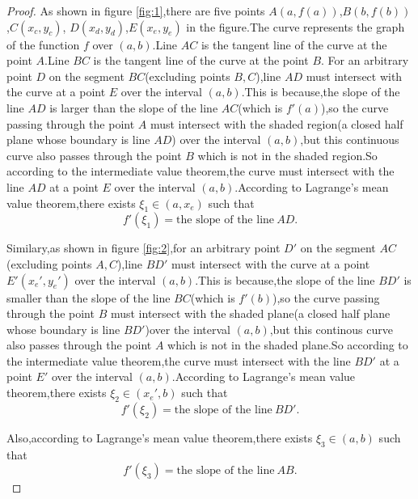\documentclass{article} \usepackage{maa-monthly}
\theoremstyle{theorem} \newtheorem*{theorem}{Theorem}
\theoremstyle{definition} \newtheorem*{definition}{Definition}
\begin{document}
\begin{proof}
  As shown in figure \eqref{fig:1},there are five points
  $A(a,f(a))$,$B(b,f(b))$,$C(x_c,y_c)$, $D(x_{d},y_{d})$,$E(x_e,y_e)$ in the figure.The curve represents the graph
  of the function $f$ over $(a,b)$.Line $AC$ is the tangent line of the curve at
  the point $A$.Line $BC$ is the tangent line of the curve at the
  point $B$. For an arbitrary point $D$ on the segment $BC$(excluding points
  $B,C$),line $AD$ must
  intersect with the curve at a point $E$ over the interval
  $(a,b)$.This is because,the slope of the line $AD$ is larger than
  the slope of the line $AC$(which is $f'(a)$),so the curve passing through the point
  $A$ must intersect with the shaded region(a closed half plane whose
  boundary is line $AD$) over the interval $(a,b)$,but this continuous curve also
  passes through the point $B$ which is not in the shaded region.So according to the intermediate value theorem,the curve must
  intersect with the line $AD$ at a point $E$ over the interval
  $(a,b)$.According to Lagrange's mean value theorem,there exists
  $\xi_1\in (a,x_e)$ such that 
\begin{equation}\label{eq:1}
f'(\xi_1)=\mbox{the slope of the line} ~AD.
\end{equation}

Similary,as shown in figure \eqref{fig:2},for an arbitrary point $D'$
on the segment $AC$(excluding points $A,C$),line $BD'$ must intersect with the curve at a
point $E'(x_e',y_e')$ over the interval $(a,b)$.This is because,the
slope of the line $BD'$ is smaller than the slope of the line
$BC$(which is $f'(b)$),so the curve passing through the point $B$ must
intersect with the shaded plane(a closed half plane whose boundary is
line $BD'$)over the interval $(a,b)$,but this continous curve also passes through
the point $A$ which is not in the shaded plane.So according to the intermediate value theorem,the curve must
  intersect with the line $BD'$ at a point $E'$ over the interval
  $(a,b)$.According to Lagrange's mean value theorem,there exists
  $\xi_2\in (x_e',b)$ such that
\begin{equation}\label{eq:2}
f'(\xi_2)=\mbox{the slope of the line}~BD'.
\end{equation}

Also,according to Lagrange's mean value theorem,there exists $\xi_3\in
(a,b)$ such that
\begin{equation}
  \label{eq:3}
  f'(\xi_3)=\mbox{the slope of the line}~AB.
\end{equation}


\end{proof}
\end{document}
